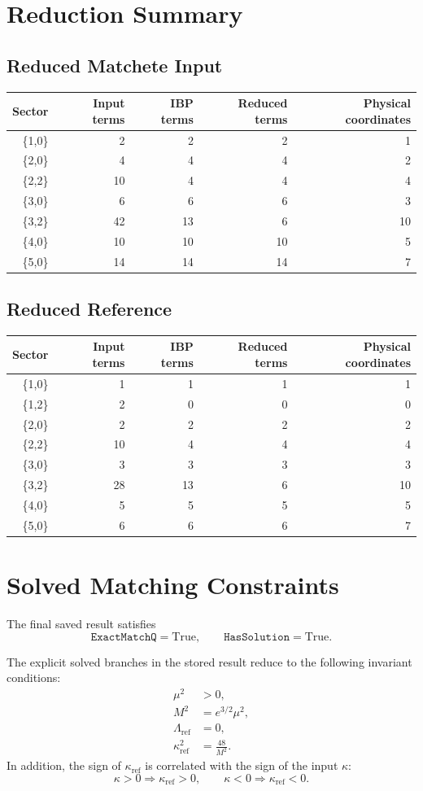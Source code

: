 \documentclass[11pt]{article}
\begin{document}
\section{Reduction Summary}
\subsection{Reduced Matchete Input}
\begin{longtable}{rrrrr}
\toprule
Sector & Input terms & IBP terms & Reduced terms & Physical coordinates \\
\midrule
\{1,0\} & 2 & 2 & 2 & 1 \\
\{2,0\} & 4 & 4 & 4 & 2 \\
\{2,2\} & 10 & 4 & 4 & 4 \\
\{3,0\} & 6 & 6 & 6 & 3 \\
\{3,2\} & 42 & 13 & 6 & 10 \\
\{4,0\} & 10 & 10 & 10 & 5 \\
\{5,0\} & 14 & 14 & 14 & 7 \\
\bottomrule
\end{longtable}

\subsection{Reduced Reference}
\begin{longtable}{rrrrr}
\toprule
Sector & Input terms & IBP terms & Reduced terms & Physical coordinates \\
\midrule
\{1,0\} & 1 & 1 & 1 & 1 \\
\{1,2\} & 2 & 0 & 0 & 0 \\
\{2,0\} & 2 & 2 & 2 & 2 \\
\{2,2\} & 10 & 4 & 4 & 4 \\
\{3,0\} & 3 & 3 & 3 & 3 \\
\{3,2\} & 28 & 13 & 6 & 10 \\
\{4,0\} & 5 & 5 & 5 & 5 \\
\{5,0\} & 6 & 6 & 6 & 7 \\
\bottomrule
\end{longtable}

\section{Solved Matching Constraints}
The final saved result satisfies
\[
\texttt{ExactMatchQ} = \mathrm{True},
\qquad
\texttt{HasSolution} = \mathrm{True}.
\]

The explicit solved branches in the stored result reduce to the following invariant conditions:
\begin{align}
\mu^2 &> 0, \\
M^2 &= e^{3/2}\mu^2, \\
\Lambda_{\mathrm{ref}} &= 0, \\
\kappa_{\mathrm{ref}}^2 &= \frac{48}{M^2}.
\end{align}
In addition, the sign of \(\kappa_{\mathrm{ref}}\) is correlated with the sign of the input \(\kappa\):
\[
\kappa>0 \Rightarrow \kappa_{\mathrm{ref}}>0,
\qquad
\kappa<0 \Rightarrow \kappa_{\mathrm{ref}}<0.
\]
\end{document}
